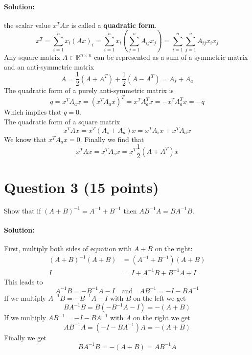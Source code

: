 \documentclass[
	10pt, %
]{../fphw}
\begin{document}
	\paragraph{Solution:} the scalar value $x^TAx$ is called a \textbf{quadratic form}.
	\begin{equation*}
		x^T = \sum_{i=1}^{n}x_i(Ax)_i = \sum_{i=1}^{n}x_i(\sum_{j=1}^{n}A_{ij}x_j) = \sum_{i=1}^{n}\sum_{j=1}^{n}A_{ij}x_ix_j
	\end{equation*}
	Any square matrix $A \in \mathbb{R}^{n \times n} $ can be represented as a sum of a symmetric matrix and an anti-symmetric matrix
	\begin{equation*}
		A = \frac{1}{2}(A+A^T) + \frac{1}{2}(A-A^T) = A_s + A_a
	\end{equation*}
	The quadratic form of a purely anti-symmetric matrix is
	\begin{equation*}
		q = x^TA_ax = (x^TA_ax)^T = x^TA_a^Tx = -x^TA_a^Tx = -q
	\end{equation*}
	Which implies that $q = 0$.\\
	The quadratic form of a square matrix
	\begin{equation*}
		x^TAx = x^T(A_s + A_a)x = x^TA_sx + x^TA_ax
	\end{equation*}
	We know that $x^TA_ax = 0$. Finally we find that
	\begin{equation*}
		x^TAx = x^TA_sx = x^T\frac{1}{2}(A+A^T)x
	\end{equation*}
	
	\section*{Question 3 (15 points)}
	\begin{problem}
		Show that if $(A + B)^{-1}=A^{-1}+B^{-1}$ then $AB^{-1}A=BA^{-1}B$.
	\end{problem}
	\paragraph{Solution:} First, multiply both sides of equation with $A+B$ on the right:
	\begin{align*}
		(A+B)^{-1}(A+B) &= (A^{-1}+B^{-1})(A+B)\\
		I &= I + A^{-1}B + B^{-1}A + I
	\end{align*}
	This leads to
	\begin{equation*}
		A^{-1}B = -B^{-1}A - I \quad\text{and}\quad AB^{-1} = -I - BA^{-1}
	\end{equation*}
	If we multiply $A^{-1}B = -B^{-1}A - I$ with $B$ on the left we get
	\begin{equation*}
		BA^{-1}B = B(-B^{-1}A-I) = -(A + B)		
	\end{equation*}
	If we multiply $AB^{-1} = -I - BA^{-1}$ with $A$ on the right we get
	\begin{equation*}
		AB^{-1}A = (-I - BA^{-1})A = -(A + B)
	\end{equation*}	
	Finally we get
	\begin{equation*}
		BA^{-1}B = -(A+B) = AB^{-1}A
	\end{equation*}
		
\end{document}
